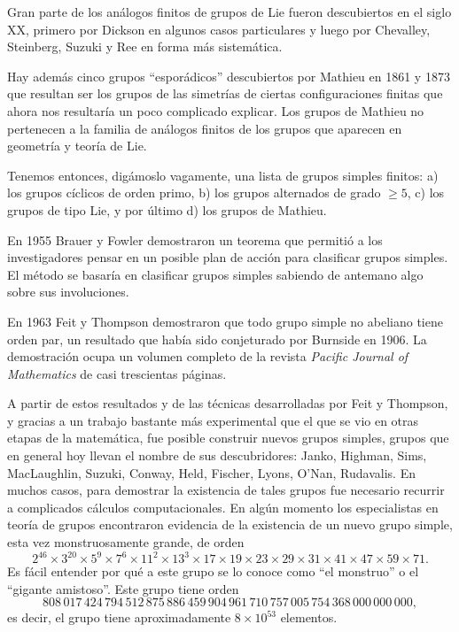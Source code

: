 Gran parte de los análogos finitos de grupos de Lie fueron descubiertos en el
siglo XX, primero por Dickson en algunos casos particulares y luego por
Chevalley, Steinberg, Suzuki y Ree en forma más sistemática. 

Hay además cinco grupos ``esporádicos'' descubiertos por Mathieu en 1861 y 1873 que resultan ser los grupos de
las simetrías de ciertas configuraciones finitas que ahora nos resultaría un poco
complicado explicar. Los grupos de Mathieu no pertenecen a la familia de análogos finitos de los grupos que
aparecen en geometría y teoría de Lie. 

Tenemos entonces,
digámoslo vagamente, una lista de grupos simples finitos: a) los grupos
cíclicos de orden primo, b) los grupos alternados de grado $\geq 5$, c) los
grupos de tipo Lie, y por último d) los grupos de Mathieu. 

En 1955 Brauer y Fowler demostraron un teorema que permitió a los investigadores
pensar en un posible plan de acción para clasificar grupos simples. El método 
se basaría en clasificar grupos simples sabiendo de antemano algo sobre sus 
involuciones.  

En 1963 Feit y Thompson demostraron que todo grupo simple no abeliano tiene orden par, 
un resultado que había sido conjeturado por Burnside en 1906. La demostración ocupa
un volumen completo de la revista \emph{Pacific Journal of Mathematics} de casi
trescientas páginas. 

A partir de estos resultados y de las técnicas desarrolladas
por Feit y Thompson, y gracias a un trabajo bastante más experimental 
que el que se vio en otras etapas de la matemática, 
fue posible construir nuevos grupos simples, grupos que en
general hoy llevan el nombre de sus descubridores: Janko, Highman, Sims,
MacLaughlin, Suzuki, Conway, Held, Fischer, Lyons, O'Nan, Rudavalis. En muchos
casos, para demostrar la existencia de tales grupos fue necesario recurrir a
complicados cálculos computacionales. En algún momento los especialistas en
teoría de grupos encontraron evidencia de la existencia de un nuevo grupo
simple, esta vez monstruosamente grande, de orden 
\[
	2^{46}\times 3^{20}\times 5^9\times 7^6\times 11^2\times 13^3\times 17\times 19\times 23\times 29\times 31\times 41\times 47\times 59\times 71. 
\]
Es fácil entender por qué a este grupo se lo conoce como ``el monstruo'' o el 
``gigante amistoso''. Este grupo tiene orden 
\[
808\,017\,424\,794\,512\,875\,886\,459\,904\,961\,710\,757\,005\,754\,368\,000\,000\,000,
\]
es decir, el grupo tiene aproximadamente $8\times 10^{53}$ elementos.

